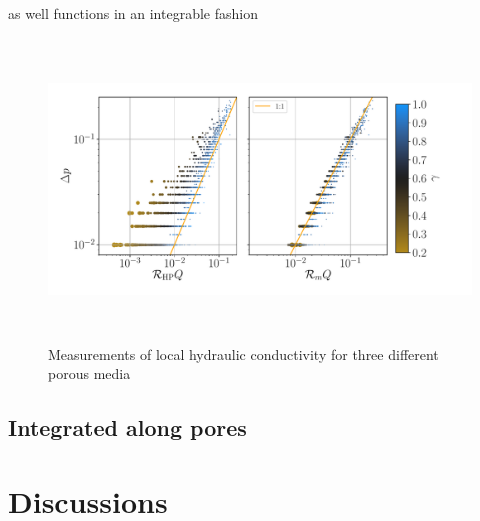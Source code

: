 \documentclass[draft]{agujournal2019}
\begin{document}
as well functions in an integrable fashion

\begin{figure}\label{fig:local_and_integrated}
\includegraphics[height=8cm]{figures/integral_dp_combined.pdf}
\caption{Measurements of local hydraulic conductivity for three different porous media}
\end{figure}


\subsection{Integrated along pores}

\begin{figure}\label{fig:histogram_R}
\end{figure}


\section{Discussions}
\end{document}
